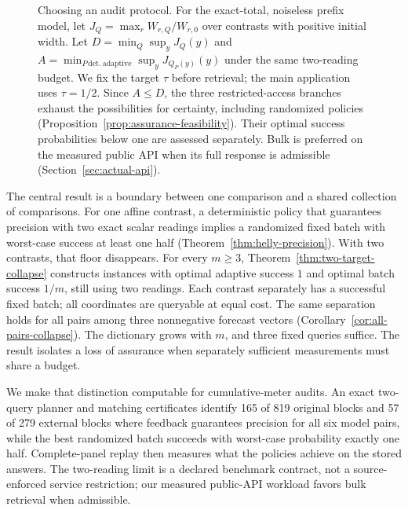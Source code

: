\documentclass[12pt]{article}
\begin{document}
\begin{figure}[htbp]
\caption{Choosing an audit protocol. For the exact-total, noiseless prefix
model, let $J_Q=\max_r W_{r,Q}/W_{r,0}$ over contrasts with positive initial
width. Let $D=\min_Q\sup_y J_Q(y)$ and
$A=\min_{P\,\mathrm{det.\ adaptive}}\sup_y J_{Q_P(y)}(y)$ under the same
two-reading budget. We fix the target $\tau$ before retrieval; the main
application uses $\tau=1/2$. Since $A\leq D$, the three restricted-access
branches exhaust the possibilities for certainty, including randomized
policies (Proposition~\ref{prop:assurance-feasibility}). Their optimal
success probabilities below one are assessed separately. Bulk is preferred on the measured public
API when its full response is admissible (Section~\ref{sec:actual-api}).}
\label{fig:audit-workflow}
\end{figure}

The central result is a boundary between one comparison and a shared
collection of comparisons. For one affine contrast, a deterministic policy
that guarantees precision with two exact scalar readings implies a
randomized fixed batch with worst-case success at least one half
(Theorem~\ref{thm:helly-precision}). With two contrasts, that floor disappears.
For every $m\geq3$, Theorem~\ref{thm:two-target-collapse} constructs instances
with optimal adaptive success $1$ and optimal batch success $1/m$, still
using two readings. Each contrast separately has a successful fixed batch;
all coordinates are queryable at equal cost. The same separation holds for
all pairs among three nonnegative forecast vectors
(Corollary~\ref{cor:all-pairs-collapse}). The dictionary grows with $m$,
and three fixed queries suffice. The result isolates a loss of assurance
when separately sufficient measurements must share a budget.

We make that distinction computable for cumulative-meter audits. An exact
two-query planner and matching certificates identify 165 of 819 original
blocks and 57 of 279 external blocks where feedback guarantees precision
for all six model pairs, while the best randomized batch succeeds with
worst-case probability exactly one half. Complete-panel replay then measures
what the policies achieve on the stored answers. The two-reading limit is
a declared benchmark contract, not a source-enforced service restriction;
our measured public-API workload favors bulk retrieval when admissible.
\end{document}
